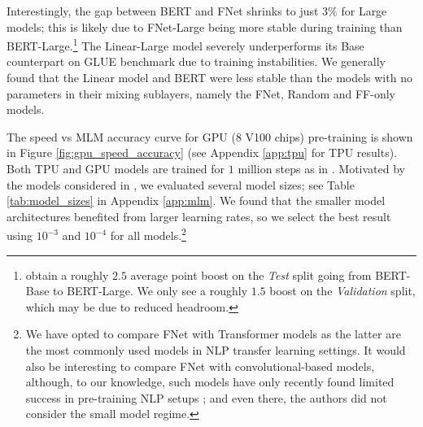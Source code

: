 \documentclass[11pt]{article}
\begin{document}
Interestingly, the gap between BERT and FNet shrinks to just $3\%$ for Large models; this is likely due to FNet-Large being more stable during training than BERT-Large.\footnote{\citet{devlin2018bert} obtain a roughly $2.5$ average point boost on the \emph{Test} split going from BERT-Base to BERT-Large. We only see a roughly $1.5$ boost on the \emph{Validation} split, which may be due to reduced headroom.} The Linear-Large model severely underperforms its Base counterpart on GLUE benchmark due to training instabilities. We generally found that the Linear model and BERT were less stable than the models with no parameters in their mixing sublayers, namely the FNet, Random and FF-only models.

The speed vs MLM accuracy curve for GPU ($8$ V100 chips) pre-training is shown in Figure \ref{fig:gpu_speed_accuracy} (see Appendix \ref{app:tpu} for TPU results). Both TPU and GPU models are trained for $1$ million steps as in \citet{devlin2018bert}. Motivated by the models considered in \citet{turc2019well}, we evaluated several model sizes; see Table \ref{tab:model_sizes} in Appendix \ref{app:mlm}. We found that the smaller model architectures benefited from larger learning rates, so we select the best result using $10^{-3}$ and $10^{-4}$ for all models.\footnote{We have opted to compare FNet with Transformer models as the latter are the most commonly used models in NLP transfer learning settings. It would also be interesting to compare FNet with convolutional-based models, although, to our knowledge, such models have only recently found limited success in pre-training NLP setups \citep{tay2021pre}; and even there, the authors did not consider the small model regime.}
\end{document}
